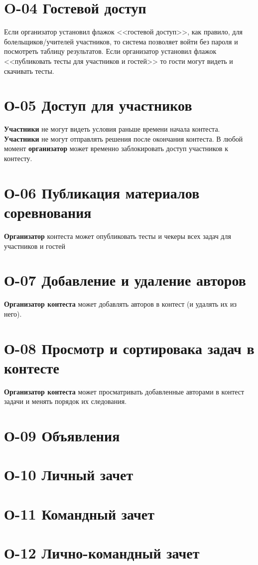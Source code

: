 \documentclass{book}
\newcommand{\newcard}[1]{\newpage \section*{#1}}
\begin{document}
\newcard{O-04 Гостевой доступ}
	Если организатор установил флажок <<гостевой доступ>>, как правило, для
	болельщиков/учителей участников, то система позволяет
	войти без пароля и посмотреть таблицу результатов.
	Если организатор установил флажок <<публиковать тесты для участников и гостей>>
	то гости могут видеть и скачивать тесты.


\newcard{О-05 Доступ для участников}
	\textbf{Участники} не могут видеть условия раньше времени начала контеста. \textbf{Участники} не могут отправлять решения после окончания контеста. В любой момент \textbf{организатор} может временно заблокировать доступ участников к контесту. 


\newcard{О-06 Публикация материалов соревнования}
	\textbf{Организатор} контеста может опубликовать тесты и чекеры всех задач для участников и гостей


\newcard{О-07 Добавление и удаление авторов}
	\textbf{Организатор контеста} может добавлять авторов в контест (и удалять их из него). 


\newcard{О-08 Просмотр и сортировака задач в контесте}
	\textbf{Организатор контеста} может просматривать добавленные авторами в контест задачи и менять порядок их следования.


\newcard{О-09 Объявления}


\newcard{О-10 Личный зачет}


\newcard{О-11 Командный зачет}


\newcard{О-12 Лично-командный зачет}
\end{document}
